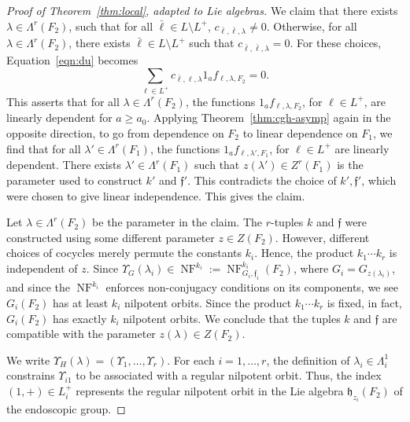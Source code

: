 \documentclass[12pt]{amsart}
\newcommand{\op}[1]{\operatorname{#1}}
\def\NF{\op{NF}}
\def\Y{\Upsilon}
\def\s{{\mathfrak{f}}}
\newcommand{\fh}{\mathfrak{h}}
\theoremstyle{plain}
\theoremstyle{definition}
\begin{document}
\begin{proof}[Proof of Theorem~\ref{thm:local}, adapted to Lie algebras]
We claim that there exists $\lambda\in \Lambda^r({F_2})$, such that
for all ${\bar\ell}\in L\setminus L^+$,
$c_{{\bar\ell},{\bar\ell},\lambda}\ne 0$.  Otherwise, for all
$\lambda\in \Lambda^r(F_2)$, there exists ${\bar\ell}\in L\setminus
L^+$ such that $c_{{\bar\ell},{\bar\ell},\lambda}=0$.  For these
choices, Equation~\ref{eqn:du} becomes
\begin{equation}\label{eqn:du2}
\sum_{\ell\in L^+} c_{{\bar\ell},\ell,\lambda}1_af_{\ell,\lambda,F_2}  = 0.
\end{equation}
This asserts that for all $\lambda\in \Lambda^r(F_2)$, the functions
$1_af_{\ell,\lambda,F_2}$, for $\ell\in L^+$, are linearly dependent
for $a\ge a_0$.  Applying Theorem~\ref{thm:cgh-asymp} again in the
opposite direction, to go from dependence on $F_2$ to linear
dependence on $F_1$, we find that for all $\lambda'\in
\Lambda^r(F_1)$, the functions $1_af_{\ell,\lambda',F_1}$, for
$\ell\in L^+$ are linearly dependent.  There exists
$\lambda'\in\Lambda^r(F_1)$ such that $z(\lambda')\in Z^r(F_1)$ is the
parameter used to construct $k'$ and $\s'$.  This contradicts the
choice of $k',\s'$, which were chosen to give linear independence.
This gives the claim.

Let $\lambda\in \Lambda^r(F_2)$ be the parameter in the claim.  The
$r$-tuples $k$ and $\s$ were constructed using some different
parameter $z\in Z(F_2)$.  However, different choices of cocycles
merely permute the constants $k_i$.  Hence, the product $k_1\cdots
k_r$ is independent of $z$.  Since $\Y_G(\lambda_i)\in
\NF^{k_i}:=\NF^{k_i}_{G_i,\s_i}(F_2)$, where $G_i = G_{z(\lambda_i)}$,
and since the $\NF^{k_i}$ enforces non-conjugacy conditions on its
components, we see $G_i(F_2)$ has at least $k_i$ nilpotent orbits.
Since the product $k_1\cdots k_r$ is fixed, in fact, $G_i(F_2)$ has
exactly $k_i$ nilpotent orbits.  We conclude that the tuples $k$ and
$\s$ are compatible with the parameter $z(\lambda)\in Z(F_2)$.

We write $\Y_H(\lambda)=(\Y_1,\ldots,\Y_r)$.  For each $i=1,\ldots,r$,
the definition of $\lambda_i\in\Lambda^1_i$ constrains $\Y_{i1}$ to be
associated with a regular nilpotent orbit.  Thus, the index $(1,+)\in
L^+_i$ represents the regular nilpotent orbit in the Lie algebra
$\fh_{z_i}(F_2)$ of the endoscopic group.


\end{proof}
\end{document}
